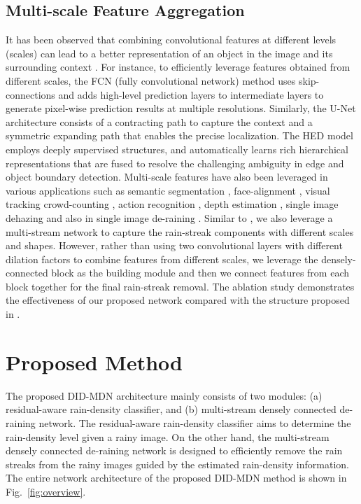 \documentclass[10pt,twocolumn,letterpaper]{article}
\begin{document}
\subsection{Multi-scale Feature Aggregation}
It has been observed that combining convolutional features at different levels (scales) can lead to a better representation of an object in the image and its surrounding context \cite{spp,psp_net,deep_residue,dense_net}.    For instance, to efficiently leverage features obtained from different scales, the FCN (fully convolutional network) method \cite{fcn} uses skip-connections and adds high-level prediction layers to intermediate layers to generate pixel-wise prediction results at multiple resolutions.  Similarly, the U-Net architecture \cite{unet} consists of a contracting path to capture the context and a symmetric expanding path that enables the precise localization.  The HED model \cite{deep_supervision} employs deeply supervised structures, and automatically learns rich hierarchical representations that are fused to resolve the challenging ambiguity in edge and object boundary detection.   Multi-scale features have also been leveraged in various applications such as semantic segmentation \cite{psp_net}, face-alignment \cite{peng_face}, visual tracking \cite{kunpeng_ijcai} crowd-counting \cite{crowd_counting_Vishwanath}, action recognition \cite{yizhu_hiddentwo}, depth estimation \cite{depth_nips_14}, single image dehazing \cite{dehaze_2016_eccv,dehaze_2017_joint} and also in single image de-raining \cite{derain_cvpr2017_multi}.  Similar to \cite{derain_cvpr2017_multi}, we also leverage a multi-stream network to capture the rain-streak components with different scales and shapes.  However, rather than using two convolutional layers with different dilation factors to combine features from different scales, we leverage the densely-connected block \cite{dense_net} as the building module and then we connect features from each block together for the final rain-streak removal. The ablation study demonstrates the effectiveness of our proposed network compared with the structure proposed in \cite{derain_cvpr2017_multi}. 

\section{Proposed Method}
The proposed DID-MDN architecture mainly consists of two modules: (a) residual-aware rain-density classifier, and (b) multi-stream densely connected de-raining network.  The residual-aware rain-density classifier aims to determine the rain-density level given a rainy image. On the other hand, the multi-stream densely connected de-raining network is designed to efficiently remove the rain streaks from the rainy images guided by the  estimated rain-density information.    The entire network architecture of the proposed DID-MDN method is shown in Fig.~\ref{fig:overview}.
\end{document}
